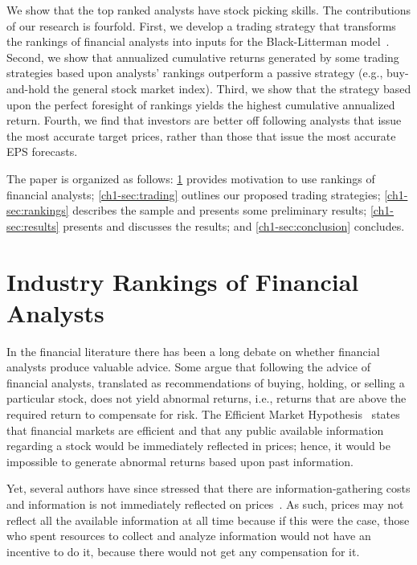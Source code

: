 \documentclass[a4paper,12pt,openright,notitlepage]{report}\usepackage[]{graphicx}\usepackage[]{color}
\begin{document}
We show that the top ranked analysts have stock picking skills. The contributions of our research is fourfold. First, we develop a trading strategy that transforms the rankings of financial analysts into inputs for the Black-Litterman model~\citep{black1992}. Second, we show that annualized cumulative returns generated by some trading strategies  based upon analysts' rankings outperform a passive strategy (e.g., buy-and-hold the general stock market index). Third, we show that the strategy based upon the perfect foresight of rankings yields the highest cumulative annualized return. Fourth, we find that investors  are better off following analysts that issue the most accurate target prices, rather than those that issue the most accurate EPS forecasts.



The paper is organized as follows: \ref{ch1-sec:ranking} provides motivation to use rankings of financial analysts; \ref{ch1-sec:trading} outlines our proposed  trading strategies; \ref{ch1-sec:rankings} describes the sample and presents some preliminary results; \ref{ch1-sec:results} presents and discusses the results; and \ref{ch1-sec:conclusion} concludes.

\section{Industry Rankings of Financial Analysts}
\label{ch1-sec:ranking}

In the financial literature there has been a long debate on whether financial analysts produce valuable  advice. Some argue that following the advice of financial analysts,  translated as recommendations of buying, holding, or selling a particular stock, does not yield  abnormal returns, i.e.,  returns that are above the required return to compensate for risk. The Efficient Market Hypothesis~\citep{fama1970ecm} states that financial markets are efficient and that any public available information  regarding a stock would be immediately reflected in prices; hence, it would be  impossible to generate abnormal returns based upon past information.

Yet, several authors have since stressed that  there are information-gathering costs and information is not immediately reflected on prices~\citep{grossman1980iie}. As such, prices may not  reflect all the available information at all time because if this were the case, those who spent resources to collect and analyze   information would not have an incentive to do it, because there would not get any compensation for it.
\end{document}
